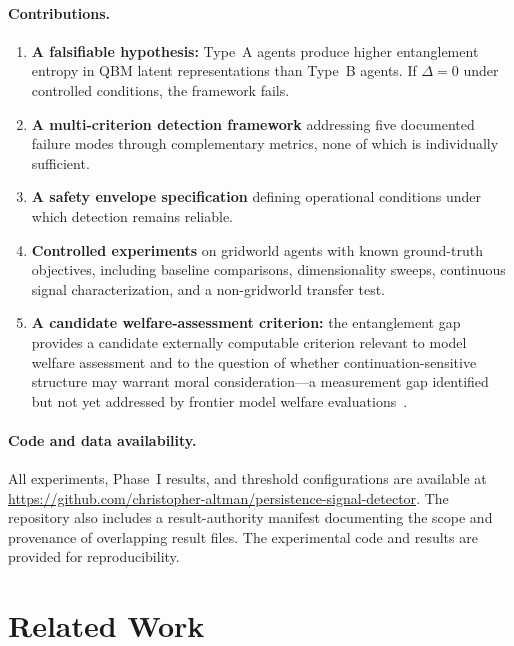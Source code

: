 \documentclass[11pt]{article}
\begin{document}
	\paragraph{Contributions.}
	\begin{enumerate}
		\item \textbf{A falsifiable hypothesis:} Type~A agents produce higher
		entanglement entropy in QBM latent representations than Type~B agents. If
		$\Delta = 0$ under controlled conditions, the framework fails.
		\item \textbf{A multi-criterion detection framework} addressing five
		documented failure modes through complementary metrics, none of which is
		individually sufficient.
		\item \textbf{A safety envelope specification} defining operational conditions
		under which detection remains reliable.
		\item \textbf{Controlled experiments} on gridworld agents with known
		ground-truth objectives, including baseline comparisons, dimensionality
		sweeps, continuous signal characterization, and a non-gridworld transfer
		test.
		\item \textbf{A candidate welfare-assessment criterion:} the
		entanglement gap provides a candidate externally computable criterion
		relevant to model welfare assessment and to the question of whether
		continuation-sensitive structure may warrant moral consideration---a
		measurement gap identified but not yet addressed by frontier model
		welfare evaluations~\cite{anthropic2026opus}.
	\end{enumerate}
	
	\paragraph{Code and data availability.}
	All experiments, Phase~I results, and threshold configurations are
	available at {\footnotesize\url{https://github.com/christopher-altman/persistence-signal-detector}}.
	The repository also includes a result-authority manifest documenting the
	scope and provenance of overlapping result files.
	The experimental code and results are provided for reproducibility.
	\section{Related Work}\label{sec:related}
	
\end{document}
